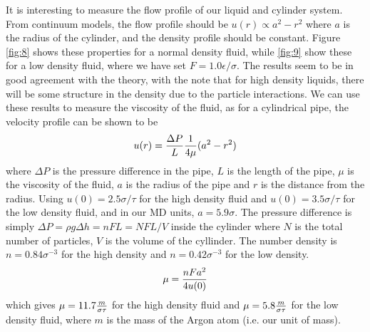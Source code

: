 \documentclass[12pt]{article}
\begin{document}
It is interesting to measure the flow profile of our liquid and cylinder system. From continuum models, the flow profile should be $u(r) \propto a^2-r^2$ where $a$ is the radius of the cylinder, and the density profile should be constant. Figure \ref{fig:8} shows these properties for a normal density fluid, while \ref{fig:9} show these for a low density fluid, where we have set $F = 1.0 \epsilon/\sigma$. The results seem to be in good agreement with the theory, with the note that for high density liquids, there will be some structure in the density due to the particle interactions. We can use these results to measure the viscosity of the fluid, as for a cylindrical pipe, the velocity profile can be shown to be 
\begin{equation}
 u(r) = {\Delta P \over L} {1 \over 4\mu }(a^2 - r^2)
\end{equation}
where $\Delta P$ is the pressure difference in the pipe, $L$ is the length of the pipe, $\mu$ is the viscosity of the fluid, $a$ is the radius of the pipe and $r$ is the distance from the radius. Using $u(0) = 2.5\sigma/\tau$ for the high density fluid and $u(0) = 3.5\sigma/\tau$ for the low density fluid, and in our MD units, $a = 5.9\sigma$. The pressure difference is simply $\Delta P = \rho g \Delta h = nFL = NFL/V$ inside the cylinder where $N$ is the total number of particles, $V$ is the volume of the cyllinder. The number density is $n=0.84\sigma^{-3}$ for the high density and $n=0.42\sigma^{-3}$ for the low density.
\begin{equation}
 \mu = {nFa^2\over 4u(0)}
\end{equation}
which gives $\mu = 11.7 {m\over \sigma \tau}$ for the high density fluid and $\mu = 5.8 {m\over \sigma \tau}$ for the low density fluid, where $m$ is the mass of the Argon atom (i.e. our unit of mass).
\end{document}
